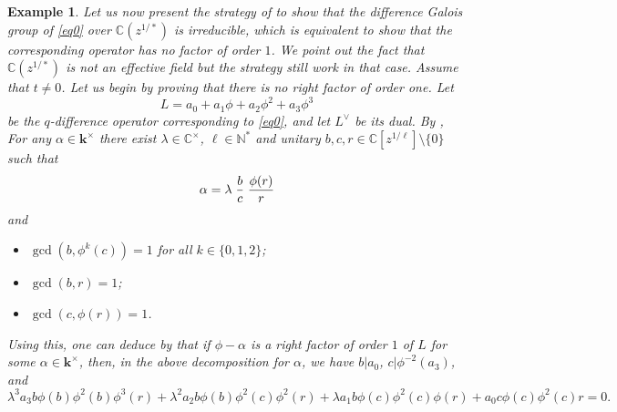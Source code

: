 \documentclass[a4paper,11pt]{amsart}
\newtheorem{ex}[thm]{Example}
\def\k{\mathbf{k}}
\def\N{\mathbb{N}}
\def\C{\mathbb{C}}
\begin{document}
\begin{ex}\label{ex1}
Let us now present the strategy of \cite{abramov2021rational} to show that the difference Galois group of  \eqref{eq0} over $\C(z^{1/*})$ is irreducible, which is equivalent to show that the corresponding operator has no factor of order $1$. We point out the fact that $\C(z^{1/*})$ is not an effective field but the strategy still work in that case. 
Assume that $t\neq 0$. 
 Let us begin by proving that there is no right factor of order one. Let 
 $$L=a_0+a_1 \phi+ a_2\phi^2+a_3 \phi^3$$
  be the $q$-difference operator corresponding to \eqref{eq0}, and let $L^{\vee} $ be its dual. 
By  \cite[Lemma 3]{abramov2021rational},
 For any $\alpha \in \k^{\times}$  there exist $\lambda \in \C^{\times}$, $\ell\in\N^*$ and unitary $b,c,r\in \C[z^{1/\ell}] \setminus \{0\}$  such that 
$$
  \alpha =\lambda\hspace{0.1cm}  \frac{b}{c} \hspace{0.1cm}\frac{\phi(r)}{r}
$$
 and 
\begin{itemize}
\item $\gcd (b, \phi^k (c))=1$ for all $k\in \lbrace 0,1, 2\rbrace$;
\item $\gcd (b, r)=1$;
\item $\gcd (c, \phi (r))=1$.
\end{itemize}
Using this, one can deduce by  \cite[Lemma 3]{abramov2021rational} that if $\phi-\alpha$ is a right factor of order $1$ of $L$ for some  $\alpha \in \k^{\times}$, then, in the above decomposition for $\alpha$, we have $b \vert a_{0}$,   $c \vert \phi^{-2}(a_{3})$,  and 
\begin{equation}\label{eq:bla}
 \lambda^3  a_{3} b \phi(b)\phi^2 (b)  \phi^3 (r) +\lambda^2 a_{2}  b \phi(b)\phi^2 (c) \phi^2 (r)+\lambda a_{1} b \phi(c)\phi^2 (c)  \phi (r)+ a_{0} c \phi(c)\phi^2 (c) r=0.
\end{equation}



\end{ex}
\end{document}
